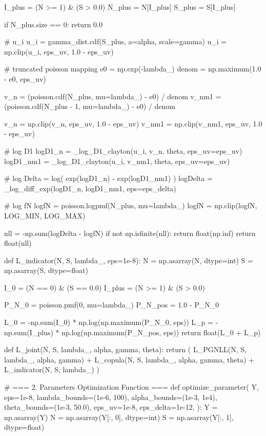     I_plus = (N >= 1) & (S > 0.0)
    N_plus = N[I_plus]
    S_plus = S[I_plus]

    if N_plus.size == 0:
        return 0.0

    # u_i
    u_i = gamma_dist.cdf(S_plus, a=alpha, scale=gamma)
    u_i = np.clip(u_i, eps_uv, 1.0 - eps_uv)

    # truncated poisson mapping
    e0 = np.exp(-lambda_)
    denom = np.maximum(1.0 - e0, eps_uv)

    v_n   = (poisson.cdf(N_plus,     mu=lambda_) - e0) / denom
    v_nm1 = (poisson.cdf(N_plus - 1, mu=lambda_) - e0) / denom

    v_n   = np.clip(v_n,   eps_uv, 1.0 - eps_uv)
    v_nm1 = np.clip(v_nm1, eps_uv, 1.0 - eps_uv)

    # log D1
    logD1_n   = _log_D1_clayton(u_i, v_n,   theta, eps_uv=eps_uv)
    logD1_nm1 = _log_D1_clayton(u_i, v_nm1, theta, eps_uv=eps_uv)

    # log Delta = log( exp(logD1_n) - exp(logD1_nm1) )
    logDelta = _log_diff_exp(logD1_n, logD1_nm1, eps=eps_delta)

    # log fN
    logfN = poisson.logpmf(N_plus, mu=lambda_)
    logfN = np.clip(logfN, LOG_MIN, LOG_MAX)

    nll = -np.sum(logDelta - logfN)
    if not np.isfinite(nll):
        return float(np.inf)
    return float(nll)


def L_indicator(N, S, lambda_, eps=1e-8):
    N = np.asarray(N, dtype=int)
    S = np.asarray(S, dtype=float)

    I_0 = (N == 0) & (S == 0.0)
    I_plus = (N >= 1) & (S > 0.0)

    P_N_0 = poisson.pmf(0, mu=lambda_)
    P_N_pos = 1.0 - P_N_0

    L_0 = -np.sum(I_0) * np.log(np.maximum(P_N_0, eps))
    L_p = -np.sum(I_plus) * np.log(np.maximum(P_N_pos, eps))
    return float(L_0 + L_p)


def L_joint(N, S, lambda_, alpha, gamma, theta):
    return (
        L_PGNLL(N, S, lambda_, alpha, gamma)
        + L_copula(N, S, lambda_, alpha, gamma, theta)
        + L_indicator(N, S, lambda_)
    )


# === 2. Parameters Optimization Function ===
def optimize_parameter(
    Y,
    eps=1e-8,
    lambda_bounds=(1e-6, 100),
    alpha_bounds=(1e-3, 1e4),
    theta_bounds=(1e-3, 50.0),
    eps_uv=1e-8,
    eps_delta=1e-12,
):
    Y = np.asarray(Y)
    N = np.asarray(Y[:, 0], dtype=int)
    S = np.asarray(Y[:, 1], dtype=float)

